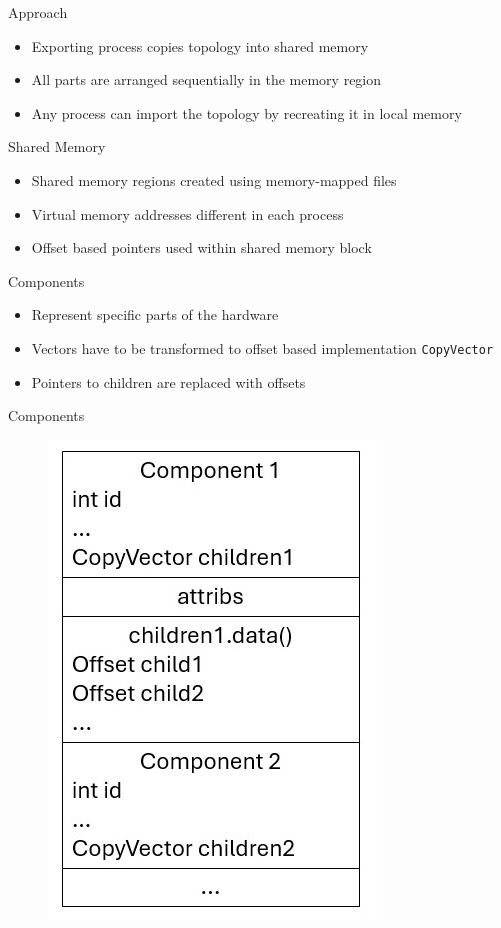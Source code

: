 \documentclass{beamer}
\begin{document}
\begin{frame}{Approach}
    \begin{itemize}
        \item Exporting process copies topology into shared memory
        \item All parts are arranged sequentially in the memory region
        \item Any process can import the topology by recreating it in local memory
    \end{itemize}
\end{frame}

\begin{frame}{Shared Memory}
    \begin{itemize}
        \item Shared memory regions created using memory-mapped files
        \item Virtual memory addresses different in each process
        \item Offset based pointers used within shared memory block
    \end{itemize}
\end{frame}

\begin{frame}{Components}
    \begin{itemize}
        \item Represent specific parts of the hardware
        \item Vectors have to be transformed to offset based implementation \lstinline|CopyVector|
        \item Pointers to children are replaced with offsets
    \end{itemize}
\end{frame}

\begin{frame}{Components}
    \begin{figure}[!ht]
        \includegraphics[scale=0.55]{../images/component_memory.jpg}
        \centering
    \end{figure}
\end{frame}
\end{document}
